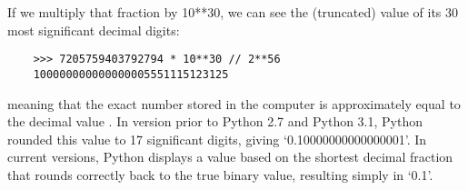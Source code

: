 \documentclass[UTF8]{article}
\begin{document}
If we multiply that fraction by 10**30, we can see the (truncated) value of its 30 most significant
decimal digits:
\begin{verbatim}
    >>> 7205759403792794 * 10**30 // 2**56
    100000000000000005551115123125
\end{verbatim}
meaning that the exact number stored in the computer is approximately equal to the decimal value
. In version prior to Python 2.7 and Python 3.1, Python rounded this
value to 17 significant digits, giving `0.10000000000000001'. In current versions, Python displays
a value based on the shortest decimal fraction that rounds correctly back to the true binary value,
resulting simply in `0.1'.
\end{document}
